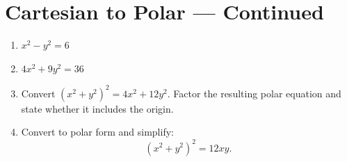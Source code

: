 \documentclass[12pt]{article}
\begin{document}
\section*{Cartesian to Polar --- Continued}
\begin{enumerate}[leftmargin=*,itemsep=0pt,resume]
  \item $x^2-y^2=6$
  \par{}

  \item $4x^2+9y^2=36$
  \par{}

  \item Convert $(x^2+y^2)^2=4x^2+12y^2$.
  Factor the resulting polar equation and state whether it includes the origin.
  \par{}

  \item Convert to polar form and simplify:
  \[
    (x^2+y^2)^2=12xy.
  \]
  \par{}
\end{enumerate}
\end{document}
